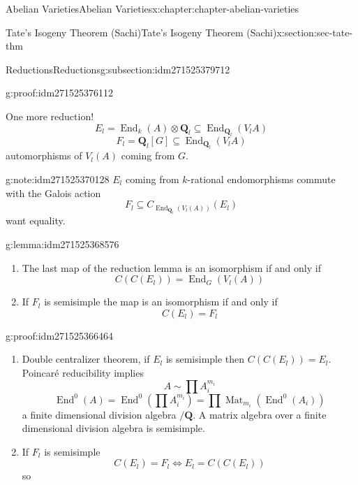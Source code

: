 \documentclass[oneside,10pt,]{book}
\numberwithin{equation}{section}
\newcommand{\QQ}{\mathbf{Q}}
\DeclareMathOperator{\End}{End}
\DeclareMathOperator{\Mat}{Mat}
\begin{document}
\begin{chapterptx}{Abelian Varieties}{}{Abelian Varieties}{}{}{x:chapter:chapter-abelian-varieties}
\begin{sectionptx}{Tate's Isogeny Theorem (Sachi)}{}{Tate's Isogeny Theorem (Sachi)}{}{}{x:section:sec-tate-thm}
\begin{subsectionptx}{Reductions}{}{Reductions}{}{}{g:subsection:idm271525379712}
\begin{proofptx}{}{g:proof:idm271525376112}
%
\end{proofptx}
One more reduction!%
\begin{equation*}
E_l = \End_k(A) \otimes \QQ_l\subseteq \End_{\QQ_l} (V_lA)
\end{equation*}
%
\begin{equation*}
F_l = \QQ_l[G] \subseteq \End_{\QQ_l} (V_lA)
\end{equation*}
automorphisms of \(V_l(A) \) coming from \(G\).%
\begin{note}{}{g:note:idm271525370128}%
\(E_l\) coming from \(k\)-rational endomorphisms commute with the Galois action%
\begin{equation*}
F_l\subseteq C_{\End_{\QQ_l}(V_l(A))}(E_l)
\end{equation*}
want equality.%
\end{note}
\begin{lemma}{}{}{g:lemma:idm271525368576}%
%
\begin{enumerate}
\item{}The last map of the reduction lemma is an isomorphism if and only if%
\begin{equation*}
C(C(E_l)) = \End_G(V_l(A))
\end{equation*}
%
\item{}If \(F_l\) is semisimple the map is an isomorphism if and only if%
\begin{equation*}
C(E_l) = F_l
\end{equation*}
%
\end{enumerate}
%
\end{lemma}
\begin{proofptx}{}{g:proof:idm271525366464}
%
\begin{enumerate}
\item{}Double centralizer theorem, if \(E_l\) is semisimple then \(C(C(E_l))= E_l\). Poincaré reducibility implies%
\begin{equation*}
A\sim \prod A_i^{m_i}
\end{equation*}
%
\begin{equation*}
\End^0(A) = \End^0(\prod A_i^{m_i}) = \prod \Mat_{m_i}(\End^0(A_i))
\end{equation*}
a finite dimensional division algebra \(/\QQ\). A matrix algebra over a finite dimensional division algebra is semisimple.%
\item{}If \(F_l\) is semisimple%
\begin{equation*}
C(E_l) = F_l \iff E_l = C(C(E_l))
\end{equation*}
so%
\begin{equation*}

\end{equation*}
\end{enumerate}
\end{proofptx}
\end{subsectionptx}
\end{sectionptx}
\end{chapterptx}
\end{document}
